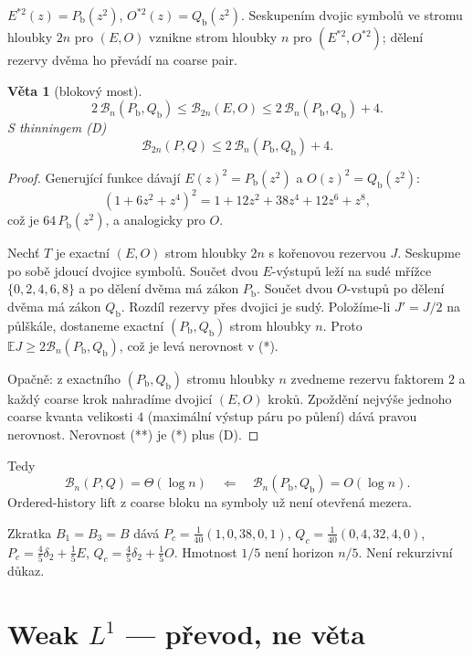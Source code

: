 \documentclass[11pt,a4paper]{article}
\newtheorem{theorem}{Věta}
\theoremstyle{definition}
\theoremstyle{remark}
\theoremstyle{plain}
\newcommand{\E}{\mathbb E}
\begin{document}
$E^{*2}(z)=P_{\mathrm b}(z^2)$, $O^{*2}(z)=Q_{\mathrm b}(z^2)$.
Seskupením dvojic symbolů ve stromu hloubky $2n$ pro $(E,O)$ vznikne
strom hloubky $n$ pro $(E^{*2},O^{*2})$; dělení rezervy dvěma ho
převádí na coarse pair.

\begin{theorem}[blokový most]
\[
2\,\mathcal B_n(P_{\mathrm b},Q_{\mathrm b})
\le
\mathcal B_{2n}(E,O)
\le
2\,\mathcal B_n(P_{\mathrm b},Q_{\mathrm b})+4.
\tag{*}
\]
S thinningem (D)
\[
\mathcal B_{2n}(P,Q)
\le
2\,\mathcal B_n(P_{\mathrm b},Q_{\mathrm b})+4.
\tag{**}
\]
\end{theorem}

\begin{proof}
Generující funkce dávají $E(z)^2=P_{\mathrm b}(z^2)$ a $O(z)^2=Q_{\mathrm b}(z^2)$:
\[
(1+6z^2+z^4)^2=1+12z^2+38z^4+12z^6+z^8,
\]
což je $64\,P_{\mathrm b}(z^2)$, a analogicky pro $O$.

Nechť $T$ je exactní $(E,O)$ strom hloubky $2n$ s kořenovou rezervou $J$.
Seskupme po sobě jdoucí dvojice symbolů. Součet dvou $E$-výstupů leží
na sudé mřížce $\{0,2,4,6,8\}$ a po dělení dvěma má zákon $P_{\mathrm b}$.
Součet dvou $O$-vstupů po dělení dvěma má zákon $Q_{\mathrm b}$.
Rozdíl rezervy přes dvojici je sudý. Položíme-li $J'=J/2$ na
půlškále, dostaneme exactní $(P_{\mathrm b},Q_{\mathrm b})$ strom hloubky
$n$. Proto $\E J\ge 2\mathcal B_n(P_{\mathrm b},Q_{\mathrm b})$, což je
levá nerovnost v (*).

Opačně: z exactního $(P_{\mathrm b},Q_{\mathrm b})$ stromu hloubky $n$
zvedneme rezervu faktorem $2$ a každý coarse krok nahradíme dvojicí
$(E,O)$ kroků. Zpoždění nejvýše jednoho coarse kvanta velikosti $4$
(maximální výstup páru po půlení) dává pravou nerovnost.
Nerovnost (**) je (*) plus (D).
\end{proof}

Tedy
\[
\mathcal B_n(P,Q)=\Theta(\log n)
\quad\Longleftarrow\quad
\mathcal B_n(P_{\mathrm b},Q_{\mathrm b})=O(\log n).
\]
Ordered-history lift z coarse bloku na symboly už není otevřená mezera.

Zkratka $B_1=B_3=B$ dává
$P_c=\frac1{40}(1,0,38,0,1)$, $Q_c=\frac1{40}(0,4,32,4,0)$,
$P_c=\frac45\delta_2+\frac15 E$, $Q_c=\frac45\delta_2+\frac15 O$.
Hmotnost $1/5$ není horizon $n/5$. Není rekurzivní důkaz.

\section{Weak $L^1$ --- převod, ne věta}
\end{document}
